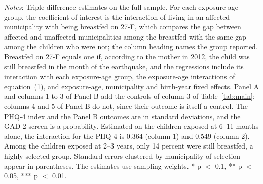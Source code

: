 \begin{table}[htbp]
\begin{minipage}{460pt}
{\textit{Notes}: Triple-difference estimates on the full sample. For each exposure-age group, the coefficient of interest is the interaction of living in an affected municipality with being breastfed on 27-F, which compares the gap between affected and unaffected municipalities among the breastfed with the same gap among the children who were not; the column heading names the group reported. Breastfed on 27-F equals one if, according to the mother in 2012, the child was still breastfed in the month of the earthquake, and the regressions include its interaction with each exposure-age group, the exposure-age interactions of equation~(1), and exposure-age, municipality and birth-year fixed effects. Panel A and columns 1 to 3 of Panel B add the controls of column 3 of Table~\ref{tab:main}; columns 4 and 5 of Panel B do not, since their outcome is itself a control. The PHQ-4 index and the Panel B outcomes are in standard deviations, and the GAD-2 screen is a probability. Estimated on the children exposed at 6--11 months alone, the interaction for the PHQ-4 is 0.364 (column 1) and 0.549 (column 2). Among the children exposed at 2--3 years, only 14 percent were still breastfed, a highly selected group. Standard errors clustered by municipality of selection appear in parentheses. The estimates use sampling weights. * p $<$ 0.1, ** p $<$ 0.05, *** p $<$ 0.01.
\par}
\end{minipage}
\end{table}
